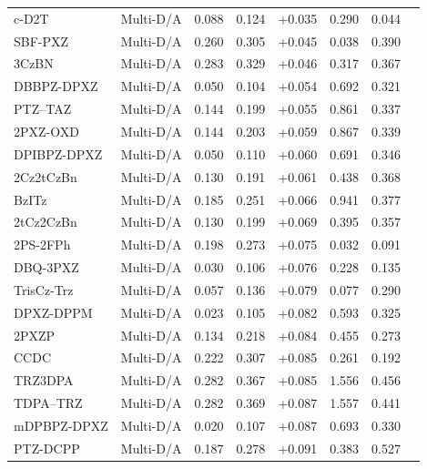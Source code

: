 \begin{longtable}{llcccccc}
c-D2T & Multi-D/A & 0.088 & 0.124 & +0.035 & 0.290 & 0.044 & \cite{doi101039D2TC00212D} \\
SBF-PXZ & Multi-D/A & 0.260 & 0.305 & +0.045 & 0.038 & 0.390 & \cite{doi101016jorgel2020105825} \\
3CzBN & Multi-D/A & 0.283 & 0.329 & +0.046 & 0.317 & 0.367 & \cite{doi101039C5SC04755B} \\
DBBPZ-DPXZ & Multi-D/A & 0.050 & 0.104 & +0.054 & 0.692 & 0.321 & \cite{doi101016jcej2021134423} \\
PTZ--TAZ & Multi-D/A & 0.144 & 0.199 & +0.055 & 0.861 & 0.337 & \cite{doi101039D0TC02252G} \\
2PXZ-OXD & Multi-D/A & 0.144 & 0.203 & +0.059 & 0.867 & 0.339 & \cite{doi101039D0TC02252G} \\
DPIBPZ-DPXZ & Multi-D/A & 0.050 & 0.110 & +0.060 & 0.691 & 0.346 & \cite{doi101016jcej2021134423} \\
2Cz2tCzBn & Multi-D/A & 0.130 & 0.191 & +0.061 & 0.438 & 0.368 & \cite{doi101039D0TC00718H} \\
BzITz & Multi-D/A & 0.185 & 0.251 & +0.066 & 0.941 & 0.377 & \cite{doi101039D2QM00806H} \\
2tCz2CzBn & Multi-D/A & 0.130 & 0.199 & +0.069 & 0.395 & 0.357 & \cite{doi101039D0TC00718H} \\
2PS-2FPh & Multi-D/A & 0.198 & 0.273 & +0.075 & 0.032 & 0.091 & \cite{doi101016jsnb2023133295} \\
DBQ-3PXZ & Multi-D/A & 0.030 & 0.106 & +0.076 & 0.228 & 0.135 & \cite{doi101039C7SC04669C} \\
TrisCz-Trz & Multi-D/A & 0.057 & 0.136 & +0.079 & 0.077 & 0.290 & \cite{doi101016jdyepig201701053} \\
DPXZ-DPPM & Multi-D/A & 0.023 & 0.105 & +0.082 & 0.593 & 0.325 & \cite{doi101039C9TC05892C} \\
2PXZP & Multi-D/A & 0.134 & 0.218 & +0.084 & 0.455 & 0.273 & \cite{doi101016jdyepig2020108437} \\
CCDC & Multi-D/A & 0.222 & 0.307 & +0.085 & 0.261 & 0.192 & \cite{doi101039C7QM00195A} \\
TRZ3DPA & Multi-D/A & 0.282 & 0.367 & +0.085 & 1.556 & 0.456 & \cite{doi101016jcej2021133030} \\
TDPA--TRZ & Multi-D/A & 0.282 & 0.369 & +0.087 & 1.557 & 0.441 & \cite{doi101016jcej2021133030} \\
mDPBPZ-DPXZ & Multi-D/A & 0.020 & 0.107 & +0.087 & 0.693 & 0.330 & \cite{doi101016jcej2021134423} \\
PTZ-DCPP & Multi-D/A & 0.187 & 0.278 & +0.091 & 0.383 & 0.527 & \cite{doi101016jorgel201804045} \\

\end{longtable}
